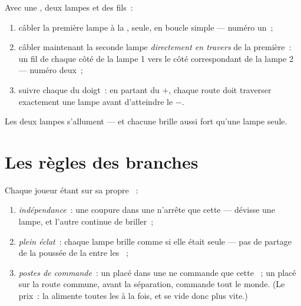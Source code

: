 \begin{method}[Le construire]\label{met:g5:series-parallel-circuits:build}
Avec une , deux lampes et des fils~:
\begin{enumerate}
  \item câbler la première lampe à la , seule, en boucle
        simple ---  numéro un~;
  \item câbler maintenant la seconde lampe \emph{directement en
        travers} de la première~: un fil de chaque côté de la lampe 1
        vers le côté correspondant de la lampe 2 ---  numéro
        deux~;
  \item suivre chaque  du doigt~: en partant du $+$, chaque
        route doit traverser exactement une lampe avant d'atteindre
        le $-$.
\end{enumerate}
Les deux lampes s'allument --- et chacune brille aussi fort qu'une
lampe seule.
\end{method}

\section{Les règles des branches}

\begin{proposition}\label{prop:g5:series-parallel-circuits:rules}
Chaque joueur étant sur sa propre ~:
\begin{enumerate}
  \item \emph{indépendance}~: une coupure dans une  n'arrête
        que cette  --- dévisse une lampe, et l'autre continue
        de briller~;
  \item \emph{plein éclat}~: chaque lampe brille comme si elle était
        seule --- pas de partage de la poussée de la  entre les
        ~;
  \item \emph{postes de commande}~: un  placé dans une
         ne commande que cette ~; un  placé
        sur la route commune, avant la séparation, commande tout le
        monde. (Le prix~: la  alimente toutes les  à la
        fois, et se vide donc plus vite.)
\end{enumerate}
\end{proposition}

